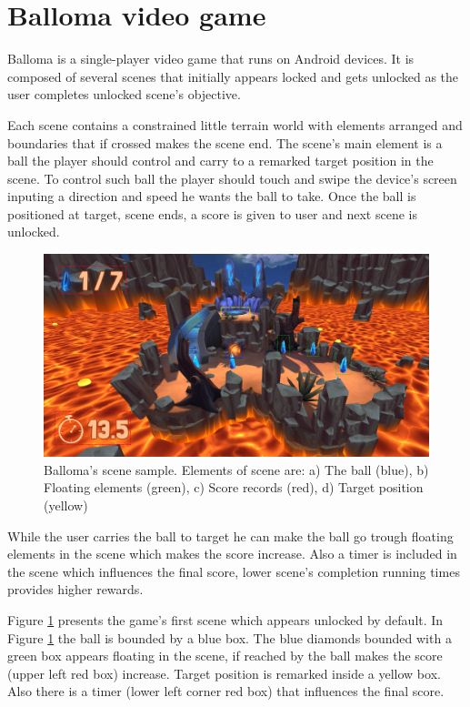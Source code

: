 \documentclass[peerreview]{IEEEtran}
\begin{document}
\section{Balloma video game}
  
   Balloma is a single-player video game that runs on Android devices. It is composed of several scenes that initially appears locked and gets unlocked as the user completes unlocked scene's objective. 
   
   Each scene contains a constrained little terrain world with elements arranged and boundaries that if crossed makes the scene end. The scene's main element is a ball the player should control and carry to a remarked target position in the scene. To control such ball the player should touch and swipe the device's screen inputing a direction and speed he wants the ball to take. Once the ball is positioned at target, scene ends, a score is given to user and next scene is unlocked. 
   
   \begin{figure}[!h]
		\centering
		\includegraphics[width=0.9\columnwidth]{img/balloma_scene.jpg} 
		\caption{Balloma's scene sample. Elements of scene are: a) The ball (blue), b) Floating elements (green), c) Score records (red), d) Target position (yellow)}
		\label{fig_scene}
	\end{figure}
   
   While the user carries the ball to target he can make the ball go trough floating elements in the scene which makes the score increase. Also a timer is included in the scene which influences the final score, lower scene's completion running times provides higher rewards.
   
   Figure \ref{fig_scene} presents the game's first scene which appears unlocked by default. In Figure \ref{fig_scene} the ball is bounded by a blue box. The blue diamonds bounded with a green box appears floating in the scene, if reached by the ball makes the score (upper left red box) increase. Target position is remarked inside a yellow box. Also there is a timer (lower left corner red box) that influences the final score.
   
\end{document}

